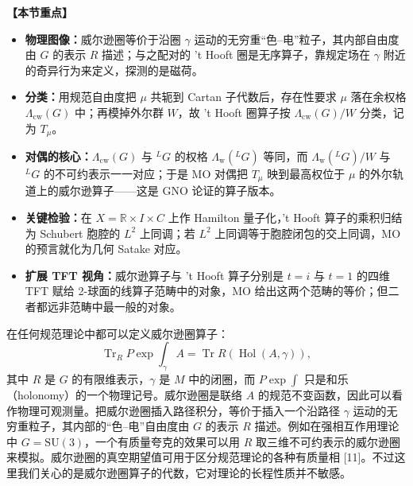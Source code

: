 \documentclass[11pt,a4paper,UTF8]{ctexart}
\newenvironment{keypoints}{%
  \par\addvspace{0.9em}%
  \noindent{\color{black!80}\rule{\linewidth}{0.6pt}}\par\nopagebreak\vspace{2pt}%
  \noindent\textbf{【本节重点】}\par\nopagebreak\vspace{2pt}%
  \begin{itemize}[leftmargin=1.6em,itemsep=1pt,topsep=2pt,parsep=0pt]%
}{%
  \end{itemize}\vspace{1pt}\noindent{\color{black!80}\rule{\linewidth}{0.6pt}}\par\addvspace{0.9em}%
}
\begin{document}
\begin{keypoints}
    \item \textbf{物理图像：}威尔逊圈等价于沿圈 $\gamma$ 运动的无穷重“色–电”粒子，其内部自由度由 $G$ 的表示 $R$ 描述；与之配对的 't Hooft 圈是无序算子，靠规定场在 $\gamma$ 附近的奇异行为来定义，探测的是磁荷。
    \item \textbf{分类：}用规范自由度把 $\mu$ 共轭到 Cartan 子代数后，存在性要求 $\mu$ 落在余权格 $\Lambda_{\mathrm{cw}}(G)$ 中；再模掉外尔群 $W$，故 't Hooft 圈算子按 $\Lambda_{\mathrm{cw}}(G)/W$ 分类，记为 $T_{\mu}$。
    \item \textbf{对偶的核心：}$\Lambda_{\mathrm{cw}}(G)$ 与 ${}^{L}G$ 的权格 $\Lambda_{\mathrm{w}}({}^{L}G)$ 等同，而 $\Lambda_{\mathrm{w}}({}^{L}G)/W$ 与 ${}^{L}G$ 的不可约表示一一对应；于是 MO 对偶把 $T_{\mu}$ 映到最高权位于 $\mu$ 的外尔轨道上的威尔逊算子——这是 GNO 论证的算子版本。
    \item \textbf{关键检验：}在 $X=\mathbb{R}\times I\times C$ 上作 Hamilton 量子化，'t Hooft 算子的乘积归结为 Schubert 胞腔的 $L^{2}$ 上同调；若 $L^{2}$ 上同调等于胞腔闭包的交上同调，MO 的预言就化为几何 Satake 对应。
    \item \textbf{扩展 TFT 视角：}威尔逊算子与 't Hooft 算子分别是 $t=i$ 与 $t=1$ 的四维 TFT 赋给 2-球面的线算子范畴中的对象，MO 给出这两个范畴的等价；但二者都远非范畴中最一般的对象。
\end{keypoints}


在任何规范理论中都可以定义威尔逊圈算子：
\[
    \operatorname{Tr}_{R} P\exp\int_{\gamma} A = \operatorname{Tr} R\left(\operatorname{Hol}(A,\gamma)\right),
\]
其中 $R$ 是 $G$ 的有限维表示，$\gamma$ 是 $M$ 中的闭圈，而 $P\exp\int$ 只是和乐（holonomy）的一个物理记号。威尔逊圈是联络 $A$ 的规范不变函数，因此可以看作物理可观测量。把威尔逊圈插入路径积分，等价于插入一个沿路径 $\gamma$ 运动的无穷重粒子，其内部的“色–电”自由度由 $G$ 的表示 $R$ 描述。例如在强相互作用理论中 $G=\mathrm{SU}(3)$，一个有质量夸克的效果可以用 $R$ 取三维不可约表示的威尔逊圈来模拟。威尔逊圈的真空期望值可用于区分规范理论的各种有质量相 [11]。不过这里我们关心的是威尔逊圈算子的代数，它对理论的长程性质并不敏感。

\end{document}
